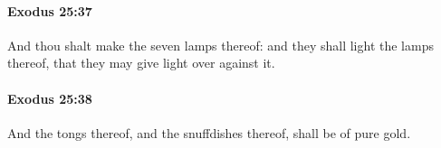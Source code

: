 		\paragraph{Exodus 25:37} %
			\label{EXODUS-25-37}

			And thou shalt make the seven lamps thereof: and they shall light the lamps thereof, that they may give light over against it.


		\paragraph{Exodus 25:38} %
			\label{EXODUS-25-38}

			And the tongs thereof, and the snuffdishes thereof, shall be of pure gold.


